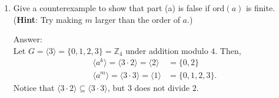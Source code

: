 \documentclass[11pt,twoside]{article}
\begin{document}
\begin{enumerate}
\begin{enumerate}
\begin{proof}[\color{red}Proof.] For the forward direction, let $\langle a^k \rangle \subseteq \langle a^m \rangle$, which said another way means that $x \in \langle a^k \rangle$ implies $x \in \langle a^m \rangle$.  Suppose that $x = \left(a^k\right)^i$ for some $i \in \mathbb{Z}$, which implies that $x = \left(a^m\right)^j$ for some $j \in \mathbb{Z}$.  Then,
\begin{align*}
a^{ki} &= a^{mj}, \text{ for some } i,j\in\mathbb{Z},\ i\neq 0, \text{ and}\\
ki &= mj \text{ (proved in HW2)}.
\end{align*}
Recall that the division algorithm states
\[
k = mq + r, \quad 0 \leq r \leq (m-1), \quad q,r\in\mathbb{Z}.
\]
By substituting for $k$ in the division algorithm, we find that $mqi + ri = mj$.  But since $i\neq 0$ as stated earlier, $r$ must be zero and $k = mj$ for some $j\in\mathbb{Z}$.  By definition, we can conclude that $m | k$.
\vspace{0.25cm}

Conversely, let $m | k$.  By definition, this means that $k = mp$ for some $p\in\mathbb{Z}$.  Suppose $x\in\langle a^k \rangle$ for some $q\in\mathbb{Z}$. Then,
\begin{align*}
x &= \left(a^k\right)^q = a^{kq}\\
&= a^{mpq} = \left(a^m\right)^{pq}
\end{align*}
Hence $x \in \langle a^m \rangle$ and $\langle a^k \rangle \subseteq \langle a^m \rangle$.
\end{proof}

\vspace{0.25cm}

\item Give a counterexample to show that part (a) is false if $\text{ord}(a)$ is finite.  ({\bf Hint}: Try making $m$ larger than the order of $a$.)

{\color{red}Answer:}\\
Let $G = \langle 3 \rangle = \{ 0, 1, 2, 3 \} = \mathbb{Z}_{4}$ under addition modulo $4$.  Then,
\begin{align*}
\langle a^k \rangle = \langle 3\cdot2 \rangle = \langle 2 \rangle &= \{ 0, 2 \}\\
\langle a^m \rangle = \langle 3\cdot3 \rangle = \langle 1 \rangle &= \{ 0, 1, 2, 3 \}.
\end{align*}
Notice that $\langle 3\cdot2 \rangle \subseteq \langle 3\cdot3 \rangle$, but $3$ does not divide $2$.
\vspace{0.25cm}


\end{enumerate}
\end{enumerate}
\end{document}
